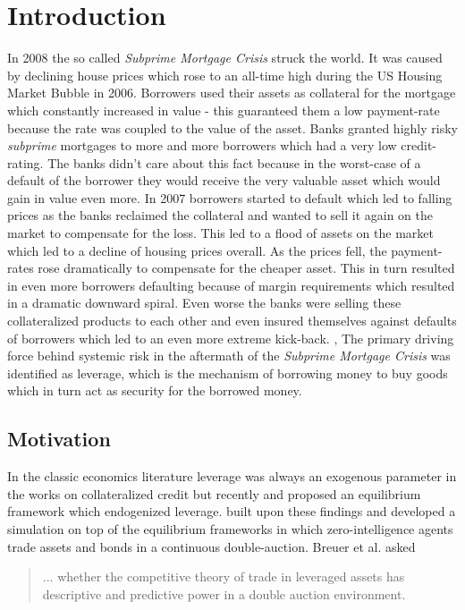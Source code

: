 \documentclass[Bachelorarbeit.tex]{subfiles}
\begin{document}
\chapter{Introduction}
In 2008 the so called \textit{Subprime Mortgage Crisis} struck the world. It was caused by declining house prices which rose to an all-time high during the US Housing Market Bubble in 2006. Borrowers used their assets as collateral for the mortgage which constantly increased in value - this guaranteed them a low payment-rate because the rate was coupled to the value of the asset. Banks granted highly risky \textit{subprime} mortgages to more and more borrowers which had a very low credit-rating. The banks didn't care about this fact because in the worst-case of a default of the borrower they would receive the very valuable asset which would gain in value even more. In 2007 borrowers started to default which led to falling prices as the banks reclaimed the collateral and wanted to sell it again on the market to compensate for the loss. This led to a flood of assets on the market which led to a decline of housing prices overall. As the prices fell, the payment-rates rose dramatically to compensate for the cheaper asset. This in turn resulted in even more borrowers defaulting because of margin requirements which resulted in a dramatic downward spiral. Even worse the banks were selling these collateralized products to each other and even insured themselves against defaults of borrowers which led to an even more extreme kick-back. \cite{SubprimeExplainedA}, \cite{SubprimeExplainedB}
\medskip
The primary driving force behind systemic risk in the aftermath of the \textit{Subprime Mortgage Crisis} was identified as leverage, which is the mechanism of borrowing money to buy goods which in turn act as security for the borrowed money.

\section{Motivation}
In the classic economics literature leverage was always an exogenous parameter in the works on collateralized credit but recently \cite{Geanakoplos2009} and \cite{GeanakoplosZame2014} proposed an equilibrium framework which endogenized leverage. \cite{Breuer2015} built upon these findings and developed a simulation on top of the equilibrium frameworks in which zero-intelligence agents trade assets and bonds in a continuous double-auction. Breuer et al. asked 

\begin{quote}
... whether the competitive theory of trade in leveraged assets has descriptive and predictive power in a double auction environment.
\end{quote}
\end{document}
